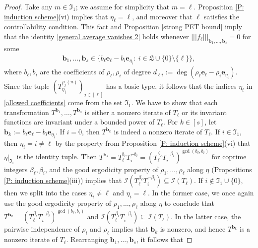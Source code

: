 \documentclass[11pt]{amsart}
\theoremstyle{definition}
\newcommand{\CI}{{\mathcal I}}
\newcommand{\FI}{{\mathfrak I}}
\newcommand{\FL}{{\mathfrak L}}
\newcommand{\be}{{\mathbf{e}}}
\renewcommand{\b}{{\textbf{b}}}
\newcommand{\nnorm}[1]{\lvert\!|\!| #1|\!|\!\rvert}
\newcommand{\brac}[1]{\mathopen{}\left( #1 \mathclose{}\right)}
\begin{document}
\begin{proof}
Take any $m\in\FI_1$; we assume for simplicity that $m = \ell$. Proposition \ref{P: induction scheme}(vi) implies that $\eta_\ell=\ell$, and moreover that $\ell$ satisfies the controllability condition. This fact and Proposition \ref{strong PET bound} imply that %
the identity \eqref{general average vanishes 2} holds whenever $\nnorm{f_\ell}_{\b_1, \ldots, \b_s} = 0$ for some
\begin{align}\label{allowed coefficients}
    \b_1, \ldots, \b_s \in\{b_\ell\be_\ell - b_i\be_{\eta_i}:\ i\in\FL\cup\{0\}\setminus\{\ell\}\},
\end{align}
where $b_\ell, b_i$ are the coefficients of $\rho_\ell, \rho_i$ of degree $d_{\ell i}:= \deg(\rho_\ell \be_\ell - \rho_i\be_{\eta_i})$.
Since the tuple $\brac{T_{\eta_j}^{\rho_j(n)}}_{j\in[\ell]}$ has a basic type, it follows that the indices $\eta_i$ in \eqref{allowed coefficients} come from the set $\FI_1$. We have to show that each transformation $T^{\b_1}, \ldots, T^{\b_s}$ is either a nonzero iterate of $T_\ell$ or its invariant functions are invariant under a bounded power of $T_\ell$. For $k\in[s]$, let $\b_k:= b_\ell\be_\ell - b_i\be_{\eta_i}$. If $i = 0$, then $T^{\b_k}$ is indeed a nonzero iterate of $T_\ell$. If $i\in\FI_1$, then $\eta_i = i\neq \ell$ by the property from Proposition \ref{P: induction scheme}(vi) that $\eta|_{\FI_1}$ is the identity tuple.
Then $T^{\b_k} = T_\ell^{b_\ell}T_i^{-b_i} = \brac{T_\ell^{\beta_\ell}T_i^{-\beta_i}}^{\gcd(b_\ell, b_i)}$ for coprime integers $\beta_\ell, \beta_i$, and the good ergodicity property of $\rho_1, \ldots, \rho_\ell$ along $\eta$ (Propositions \ref{P: induction scheme}(iii)) implies that $\CI(T_\ell^{\beta_\ell}T_i^{-\beta_i})\subseteq \CI(T_\ell)$.
If $i\notin\FI_1\cup\{0\}$, then we split into the cases $\eta_i \neq \ell$ and $\eta_i = \ell$. In the former case, we once again use the good ergodicity property of $\rho_1, \ldots, \rho_\ell$ along $\eta$ to conclude that $T^{\b_k} = \brac{T_\ell^{\beta_\ell}T_i^{-\beta_i}}^{\gcd(b_\ell, b_i)}$ and $\CI(T_\ell^{\beta_\ell}T_i^{-\beta_i})\subseteq \CI(T_\ell)$.
In the latter case, the pairwise independence of $\rho_i$ and $\rho_\ell$ implies that $\b_k$ is nonzero, and hence $T^{\b_k}$ is a nonzero iterate of $T_\ell$. Rearranging $\b_1, \ldots, \b_s$, it follows that

\end{proof}
\end{document}
